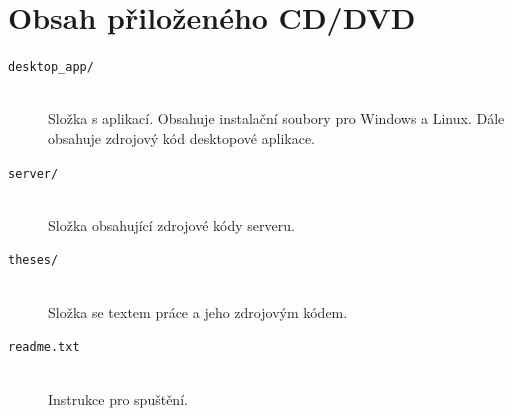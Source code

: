 \documentclass[
  glossaries,
]{kidiplom}
\begin{document}
\appendix
\section{Obsah přiloženého CD/DVD} \label{sec:ObsahCD}
\begin{description}

\item[\texttt{desktop\_app/}] \hfill \\
 Složka s aplikací. Obsahuje instalační soubory pro Windows a Linux. Dále obsahuje zdrojový kód desktopové aplikace.

\item[\texttt{server/}] \hfill \\
   Složka obsahující zdrojové kódy serveru.
   
\item[\texttt{theses/}] \hfill \\
Složka se textem práce a jeho zdrojovým kódem.

\item[\texttt{readme.txt}] \hfill \\
  Instrukce pro spuštění.
 

\end{description}
\end{document}

